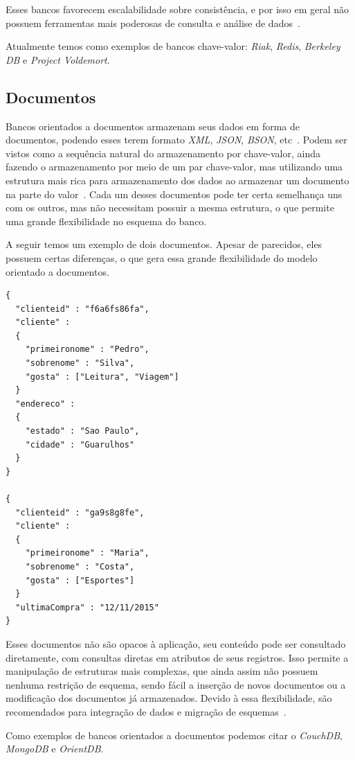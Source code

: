 Esses bancos favorecem escalabilidade sobre consistência, e por isso em geral não possuem ferramentas mais poderosas de consulta e análise de dados~\cite{chrisnosql}.

Atualmente temos como exemplos de bancos chave-valor: \emph{Riak}, \emph{Redis}, \emph{Berkeley DB} e \emph{Project Voldemort}.

\subsection*{Documentos}
Bancos orientados a documentos armazenam seus dados em forma de documentos, podendo esses terem formato \emph{XML}, \emph{JSON}, \emph{BSON}, etc~\cite{pramod}. Podem ser vistos como a sequência natural do armazenamento por chave-valor, ainda fazendo o armazenamento por meio de um par chave-valor, mas utilizando uma estrutura mais rica para armazenamento dos dados ao armazenar um documento na parte do valor~\cite{chrisnosql}. Cada um desses documentos pode ter certa semelhança uns com os outros, mas não necessitam possuir a mesma estrutura, o que permite uma grande flexibilidade no esquema do banco.

A seguir temos um exemplo de dois documentos. Apesar de parecidos, eles possuem certas diferenças, o que gera essa grande flexibilidade do modelo orientado a documentos.

\begin{lstlisting}
{
  "clienteid" : "f6a6fs86fa",
  "cliente" :
  {
    "primeironome" : "Pedro",
    "sobrenome" : "Silva", 
    "gosta" : ["Leitura", "Viagem"]
  }
  "endereco" : 
  {
    "estado" : "Sao Paulo",
    "cidade" : "Guarulhos"
  }
}

{
  "clienteid" : "ga9s8g8fe",
  "cliente" :
  {
    "primeironome" : "Maria",
    "sobrenome" : "Costa", 
    "gosta" : ["Esportes"]
  }
  "ultimaCompra" : "12/11/2015"
}
\end{lstlisting}

Esses documentos não são opacos à aplicação, seu conteúdo pode ser consultado diretamente, com consultas diretas em atributos de seus registros. Isso permite a manipulação de estruturas mais complexas, que ainda assim não possuem nenhuma restrição de esquema, sendo fácil a inserção de novos documentos ou a modificação dos documentos já armazenados. Devido à essa flexibilidade, são recomendados para integração de dados e migração de esquemas~\cite{nosqleval}. 

Como exemplos de bancos orientados a documentos podemos citar o \emph{CouchDB}, \emph{MongoDB} e \emph{OrientDB}.


